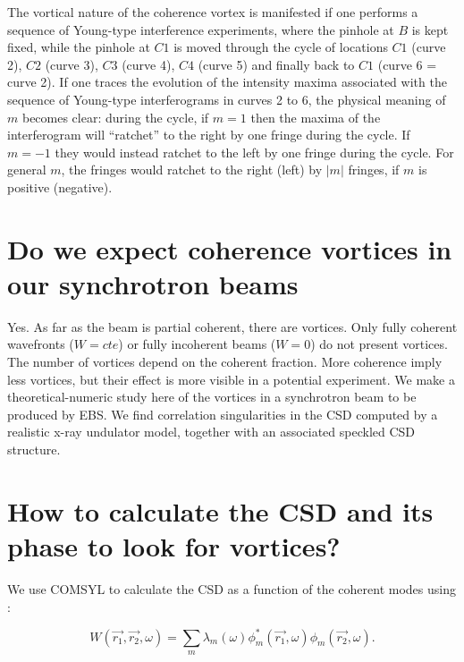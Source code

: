 \documentclass[a4paper,10pt]{article}
\begin{document}
The vortical nature of the coherence vortex is manifested if one performs a sequence of Young-type interference experiments, where the pinhole at $B$ is kept fixed, while the pinhole at $C1$ is moved through the cycle of locations $C1$ (curve 2), $C2$ (curve 3), $C3$ (curve 4), $C4$ (curve 5) and finally back to $C1$ (curve 6 = curve 2). If one traces the evolution of the intensity maxima associated with the sequence of Young-type interferograms in curves 2 to 6, the physical meaning of $m$ becomes clear: during the cycle, if $m=1$ then the maxima of the interferogram will ``ratchet'' to the right by one fringe during the cycle. If $m=-1$ they would instead ratchet to the left by one fringe during the cycle.  For general $m$, the fringes would ratchet to the right (left) by $|m|$ fringes, if $m$ is positive (negative).
 
 
\section{Do we expect coherence vortices in our synchrotron beams}

Yes. As far as the beam is partial coherent, there are vortices. Only fully coherent wavefronts ($W=cte$) or fully incoherent beams ($W=0$) do not present vortices. The number of vortices depend on the coherent fraction. More coherence imply less vortices, but their effect is more visible in a potential experiment. We make a theoretical-numeric study here of the vortices in a synchrotron beam to be produced by EBS. We find correlation singularities in the CSD computed by a realistic x-ray undulator model, together with an associated speckled CSD structure.


\section{How to calculate the CSD and its phase to look for vortices?}

We use COMSYL to calculate the CSD as a function of the coherent modes using :


\begin{equation}
W(\vec{r_1}, \vec{r_2}, \omega)
=
\sum_m
\lambda_m(\omega)
\phi_m^*(\vec{r_1},\omega)
\phi_m(\vec{r_2}, \omega).
\end{equation}
\end{document}
